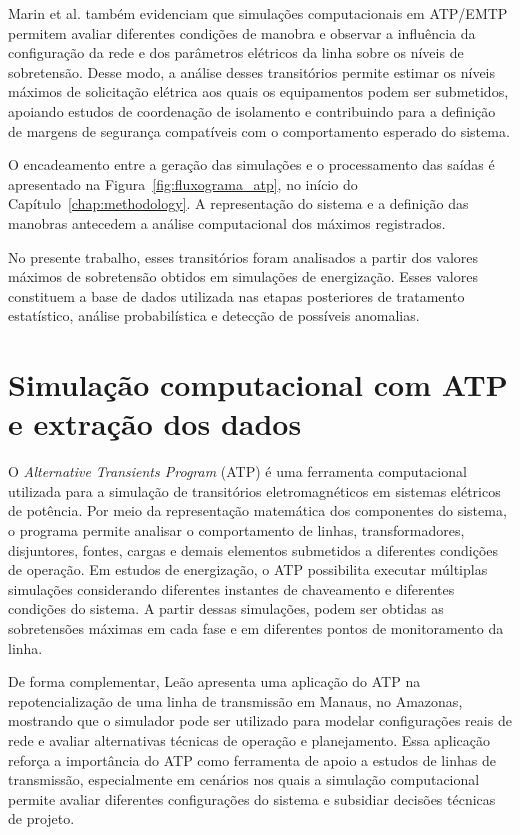 \documentclass[
	12pt,				%
	openright,			%
	oneside,			%
	a4paper,			%
	chapter=TITLE,		%
	section=TITLE,		%
	subsection=TITLE,	%
	subsubsection=TITLE,%
	english,			%
	brazilian			%
	]{abntex2}
\theoremstyle{definition}
\begin{document}
Marin et al. \cite{marin2025} também evidenciam que simulações computacionais em ATP/EMTP permitem avaliar diferentes condições de manobra e observar a influência da configuração da rede e dos parâmetros elétricos da linha sobre os níveis de sobretensão. Desse modo, a análise desses transitórios permite estimar os níveis máximos de solicitação elétrica aos quais os equipamentos podem ser submetidos, apoiando estudos de coordenação de isolamento e contribuindo para a definição de margens de segurança compatíveis com o comportamento esperado do sistema.

O encadeamento entre a geração das simulações e o processamento das saídas
é apresentado na Figura~\ref{fig:fluxograma_atp}, no início do
Capítulo~\ref{chap:methodology}. A representação do sistema e a definição
das manobras antecedem a análise computacional dos máximos registrados.

No presente trabalho, esses transitórios foram analisados a partir dos valores máximos de sobretensão obtidos em simulações de energização. Esses valores constituem a base de dados utilizada nas etapas posteriores de tratamento estatístico, análise probabilística e detecção de possíveis anomalias.
\section{Simulação computacional com ATP e extração dos dados}

O \textit{Alternative Transients Program} (ATP) é uma ferramenta computacional utilizada para a simulação de transitórios eletromagnéticos em sistemas elétricos de potência. Por meio da representação matemática dos componentes do sistema, o programa permite analisar o comportamento de linhas, transformadores, disjuntores, fontes, cargas e demais elementos submetidos a diferentes condições de operação. Em estudos de energização, o ATP possibilita executar múltiplas simulações considerando diferentes instantes de chaveamento e diferentes condições do sistema. A partir dessas simulações, podem ser obtidas as sobretensões máximas em cada fase e em diferentes pontos de monitoramento da linha.

De forma complementar, Leão \cite{leao2022} apresenta uma aplicação do ATP na repotencialização de uma linha de transmissão em Manaus, no Amazonas, mostrando que o simulador pode ser utilizado para modelar configurações reais de rede e avaliar alternativas técnicas de operação e planejamento. Essa aplicação reforça a importância do ATP como ferramenta de apoio a estudos de linhas de transmissão, especialmente em cenários nos quais a simulação computacional permite avaliar diferentes configurações do sistema e subsidiar decisões técnicas de projeto.
\end{document}
